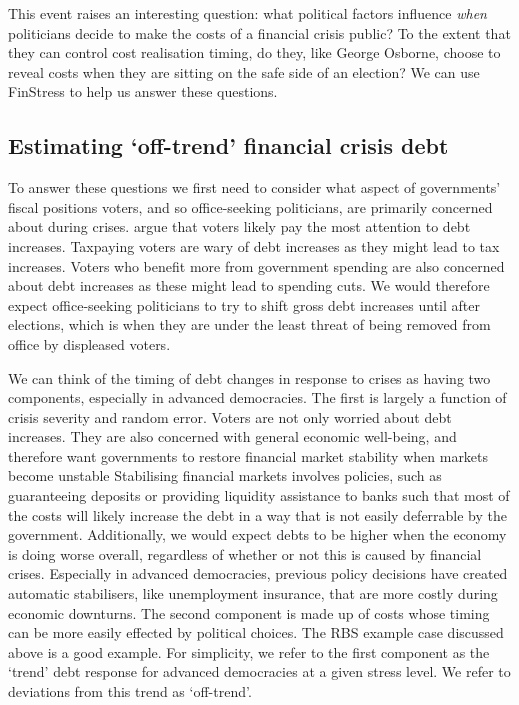 \documentclass[]{article}
\begin{document}
This event raises an interesting question: what political factors influence \emph{when} politicians decide to make the costs of a financial crisis public? To the extent that they can control cost realisation timing, do they, like George Osborne, choose to reveal costs when they are sitting on the safe side of an election? We can use FinStress to help us answer these questions.

\subsection{Estimating `off-trend' financial crisis debt}

To answer these questions we first need to consider what aspect of governments' fiscal positions voters, and so office-seeking politicians, are primarily concerned about during crises. \cite{gandrudHallerbergWEP} argue that voters likely pay the most attention to debt increases. Taxpaying voters are wary of debt increases as they might lead to tax increases. Voters who benefit more from government spending are also concerned about debt increases as these might lead to spending cuts. We would therefore expect office-seeking politicians to try to shift gross debt increases until after elections, which is when they are under the least threat of being removed from office by displeased voters.

We can think of the timing of debt changes in response to crises as having two components, especially in advanced democracies. The first is largely a function of crisis severity and random error. Voters are not only worried about debt increases. They are also concerned with general economic well-being, and therefore want governments to restore financial market stability when markets become unstable \citep{Rosas2009}  Stabilising financial markets involves policies, such as guaranteeing deposits or providing liquidity assistance to banks such that most of the costs will likely increase the debt in a way that is not easily deferrable by the government.  Additionally, we would expect debts to be higher when the economy is doing worse overall, regardless of whether or not this is caused by financial crises. Especially in advanced democracies, previous policy decisions have created automatic stabilisers, like unemployment insurance, that are more costly during economic downturns. The second component is made up of costs whose timing can be more easily effected by political choices. The RBS example case discussed above is a good example. For simplicity, we refer to the first component as the `trend' debt response for advanced democracies at a given stress level. We refer to deviations from this trend as `off-trend'.
\end{document}
